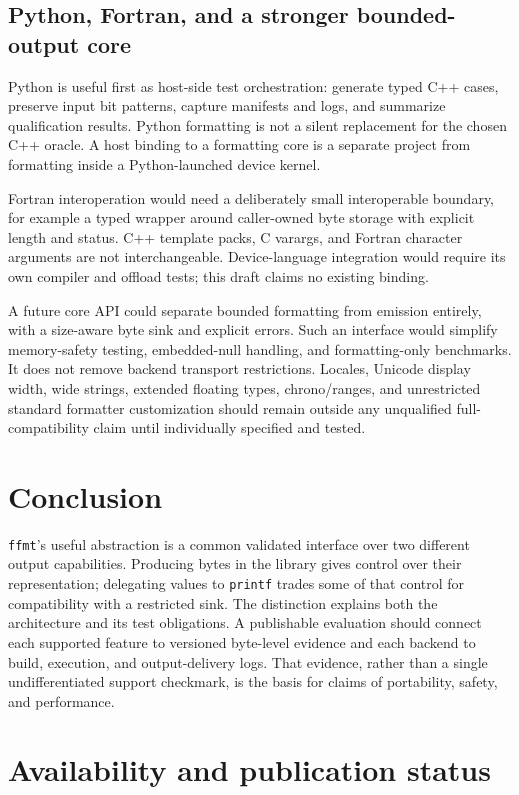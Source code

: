 \documentclass[11pt,letterpaper]{article}
\newcommand{\ffmt}{\texttt{ffmt}}
\begin{document}
\subsection{Python, Fortran, and a stronger bounded-output core}

Python is useful first as host-side test orchestration: generate typed C++
cases, preserve input bit patterns, capture manifests and logs, and summarize
qualification results. Python formatting is not a silent replacement for the
chosen C++ oracle. A host binding to a formatting core is a separate project
from formatting inside a Python-launched device kernel.

Fortran interoperation would need a deliberately small interoperable boundary,
for example a typed wrapper around caller-owned byte storage with explicit
length and status. C++ template packs, C varargs, and Fortran character
arguments are not interchangeable. Device-language integration would require
its own compiler and offload tests; this draft claims no existing binding.

A future core API could separate bounded formatting from emission entirely,
with a size-aware byte sink and explicit errors. Such an interface would
simplify memory-safety testing, embedded-null handling, and formatting-only
benchmarks. It does not remove backend transport restrictions. Locales,
Unicode display width, wide strings, extended floating types, chrono/ranges,
and unrestricted standard formatter customization should remain outside any
unqualified full-compatibility claim until individually specified and tested.

\section{Conclusion}

\ffmt's useful abstraction is a common validated interface over two different
output capabilities. Producing bytes in the library gives control over their
representation; delegating values to \texttt{printf} trades some of that
control for compatibility with a restricted sink. The distinction explains
both the architecture and its test obligations. A publishable evaluation
should connect each supported feature to versioned byte-level evidence and
each backend to build, execution, and output-delivery logs. That evidence,
rather than a single undifferentiated support checkmark, is the basis for
claims of portability, safety, and performance.

\section*{Availability and publication status}
\end{document}
